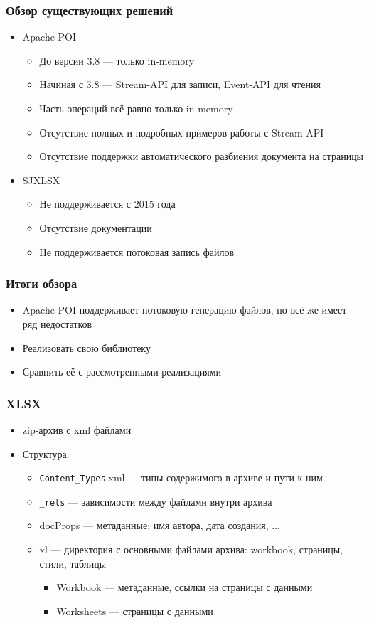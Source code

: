 \documentclass{beamer}
\begin{document}
\begin{frame}\frametitle{Обзор существующих решений}
\begin{itemize}
    \item Apache POI
    \begin{itemize}
        \item До версии 3.8 --- только in-memory
        \item Начиная с 3.8 --- Stream-API для записи, Event-API для чтения
        \item Часть операций всё равно только in-memory
        \item Отсутствие полных и подробных примеров работы с Stream-API
        \item Отсутствие поддержки автоматического разбиения документа на страницы
    \end{itemize}
    \item SJXLSX
    \begin{itemize}
        \item Не поддерживается с 2015 года
        \item Отсутствие документации
        \item Не поддерживается потоковая запись файлов
    \end{itemize}
\end{itemize}
\end{frame}

\begin{frame}\frametitle{Итоги обзора}
\begin{itemize}
    \item Apache POI поддерживает потоковую генерацию файлов, но всё же имеет ряд недостатков
    \item Реализовать свою библиотеку
    \item Сравнить её с рассмотренными реализациями
\end{itemize}
\end{frame}

\begin{frame}\frametitle{XLSX}
\begin{itemize}
    \item zip-архив с xml файлами
    \item Структура:
    \begin{itemize}
        \item \texttt{Content\_Types}.xml --- типы содержимого в архиве и пути к ним
        \item \texttt{\_rels} --- зависимости между файлами внутри архива
        \item docProps --- метаданные: имя автора, дата создания, ...
        \item xl --- директория с основными файлами архива: workbook, страницы, стили, таблицы
        \begin{itemize}
            \item Workbook --- метаданные, ссылки на страницы с данными
            \item Worksheets --- страницы с данными
        \end{itemize}
    \end{itemize}
\end{itemize}
\end{frame}
\end{document}
